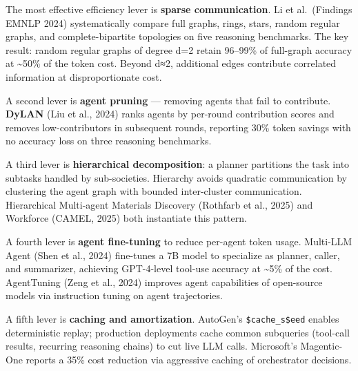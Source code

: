 The most effective efficiency lever is \textbf{sparse communication}. Li et al.~(Findings EMNLP 2024) systematically compare full graphs, rings, stars, random regular graphs, and complete-bipartite topologies on five reasoning benchmarks. The key result: random regular graphs of degree d=2 retain 96--99\% of full-graph accuracy at \textasciitilde50\% of the token cost. Beyond d≈2, additional edges contribute correlated information at disproportionate cost.

A second lever is \textbf{agent pruning} --- removing agents that fail to contribute. \textbf{DyLAN} (Liu et al., 2024) ranks agents by per-round contribution scores and removes low-contributors in subsequent rounds, reporting 30\% token savings with no accuracy loss on three reasoning benchmarks.

A third lever is \textbf{hierarchical decomposition}: a planner partitions the task into subtasks handled by sub-societies. Hierarchy avoids quadratic communication by clustering the agent graph with bounded inter-cluster communication. Hierarchical Multi-agent Materials Discovery (Rothfarb et al., 2025) and Workforce (CAMEL, 2025) both instantiate this pattern.

A fourth lever is \textbf{agent fine-tuning} to reduce per-agent token usage. Multi-LLM Agent (Shen et al., 2024) fine-tunes a 7B model to specialize as planner, caller, and summarizer, achieving GPT-4-level tool-use accuracy at \textasciitilde5\% of the cost. AgentTuning (Zeng et al., 2024) improves agent capabilities of open-source models via instruction tuning on agent trajectories.

A fifth lever is \textbf{caching and amortization}. AutoGen's \texttt{\$cache\_s\$eed} enables deterministic replay; production deployments cache common subqueries (tool-call results, recurring reasoning chains) to cut live LLM calls. Microsoft's Magentic-One reports a 35\% cost reduction via aggressive caching of orchestrator decisions.

